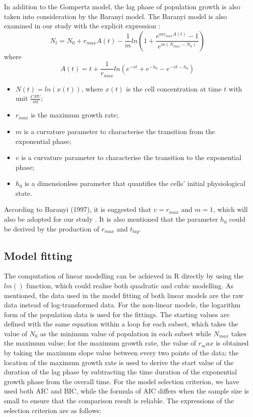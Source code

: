 \documentclass[11pt, oneside]{article}
\begin{document}
			In addition to the Gompertz model, the lag phase of population growth is also taken into consideration by the Baranyi model. The Baranyi model is also examined in our study with the explicit expression \cite{BARANYI1994277}:
			\[N_t = N_0 + r_{max} A(t) - \frac{1}{m}ln(1 + \frac{e^{mr_{max}A(t)} - 1}{e^{m(N_{max} - N_0)}})\]
			where
			\[A(t) = t + \frac{1}{r_{max}}ln(e^{-vt} + e^{-h_0} - e^{-vt - h_0}) \]
			\begin{itemize}
			\item \(N(t) = ln(x(t))\), where \(x(t)\) is the cell concentration at time \(t\) with unit \(\frac{CFU}{ml}\);
			\item \(r_{max}\) is the maximum growth rate;
			\item \(m\) is a curvature parameter to characterise the transition from the exponential phase;
			\item \(v\) is a curvature parameter to characterise the transition to the exponential phase;
			\item \(h_0\) is a dimensionless parameter that quantifies the cells' initial physiological state. \cite{GRIJSPEERDT1999593}
			\end{itemize}
			\noindent According to Baranyi (1997), it is suggested that \(v = r_{max}\) and \(m = 1\), which will also be adopted for our study \cite{GRIJSPEERDT1999593}. It is also mentioned that the parameter \(h_0\) could be derived by the production of \(r_{max}\) and \(t_{lag}\)\cite{BARANYI1994277}. 
			
 		\subsection{Model fitting}
		
		The computation of linear modelling can be achieved in R directly by using the \(lm()\) function, which could realise both quadratic and cubic modelling. As mentioned, the data used in the model fitting of both linear models are the raw data instead of log-transformed data. For the non-linear models, the logarithm form of the population data is used for the fittings. The starting values are defined with the same equation within a loop for each subset, which takes the value of \(N_0\) as the minimum value of population in each subset while \(N_{max}\) takes the maximum value; for the maximum growth rate, the value of \(r_max\) is obtained by taking the maximum slope value between every two points of the data; the location of the maximum growth rate is used to derive the start value of the duration of the lag phase by subtracting the time duration of the exponential growth phase from the overall time. For the model selection criterion, we have used both AIC and BIC, while the formula of AIC differs when the sample size is small to ensure that the comparison result is reliable. The expressions of the selection criterion are as follows:
		
\end{document}
